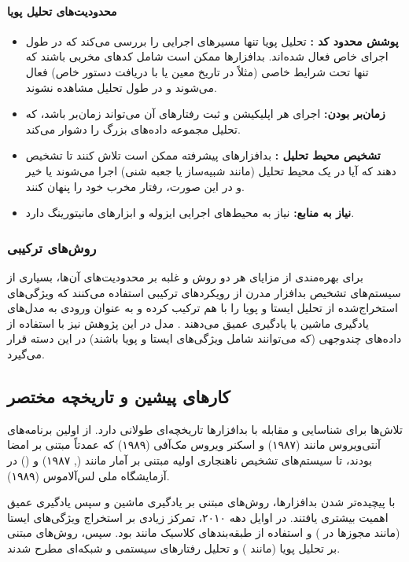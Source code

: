 \paragraph{محدودیت‌های تحلیل پویا}
\begin{itemize}
    \item \textbf{پوشش محدود کد :} تحلیل پویا تنها مسیرهای اجرایی را بررسی می‌کند که در طول اجرای خاص فعال شده‌اند. بدافزارها ممکن است شامل کدهای مخربی باشند که تنها تحت شرایط خاصی (مثلاً در تاریخ معین یا با دریافت دستور خاص) فعال می‌شوند و در طول تحلیل مشاهده نشوند.
    \item \textbf{زمان‌بر بودن:} اجرای هر اپلیکیشن و ثبت رفتارهای آن می‌تواند زمان‌بر باشد، که تحلیل مجموعه داده‌های بزرگ را دشوار می‌کند.
    \item \textbf{تشخیص محیط تحلیل :} بدافزارهای پیشرفته ممکن است تلاش کنند تا تشخیص دهند که آیا در یک محیط تحلیل (مانند شبیه‌ساز یا جعبه شنی) اجرا می‌شوند یا خیر و در این صورت، رفتار مخرب خود را پنهان کنند.
    \item \textbf{نیاز به منابع:} نیاز به محیط‌های اجرایی ایزوله و ابزارهای مانیتورینگ دارد.
\end{itemize}

\subsubsection{روش‌های ترکیبی }
برای بهره‌مندی از مزایای هر دو روش و غلبه بر محدودیت‌های آن‌ها، بسیاری از سیستم‌های تشخیص بدافزار مدرن از رویکردهای ترکیبی استفاده می‌کنند که ویژگی‌های استخراج‌شده از تحلیل ایستا و پویا را با هم ترکیب کرده و به عنوان ورودی به مدل‌های یادگیری ماشین یا یادگیری عمیق می‌دهند \cite{DeepLearningMalware}. مدل  در این پژوهش نیز با استفاده از داده‌های چندوجهی (که می‌توانند شامل ویژگی‌های ایستا و پویا باشند) در این دسته قرار می‌گیرد.

\subsection{کارهای پیشین و تاریخچه مختصر}
تلاش‌ها برای شناسایی و مقابله با بدافزارها تاریخچه‌ای طولانی دارد. از اولین برنامه‌های آنتی‌ویروس مانند  (۱۹۸۷) و اسکنر ویروس مک‌آفی (۱۹۸۹) که عمدتاً مبتنی بر امضا بودند، تا سیستم‌های تشخیص ناهنجاری اولیه مبتنی بر آمار مانند  (, ۱۹۸۷) و  () در آزمایشگاه ملی لس‌آلاموس (۱۹۸۹).

با پیچیده‌تر شدن بدافزارها، روش‌های مبتنی بر یادگیری ماشین و سپس یادگیری عمیق اهمیت بیشتری یافتند. در اوایل دهه ۲۰۱۰، تمرکز زیادی بر استخراج ویژگی‌های ایستا (مانند مجوزها در  \cite{Drebin}) و استفاده از طبقه‌بندهای کلاسیک مانند  بود. سپس، روش‌های مبتنی بر تحلیل پویا (مانند ) و تحلیل رفتارهای سیستمی و شبکه‌ای مطرح شدند.

